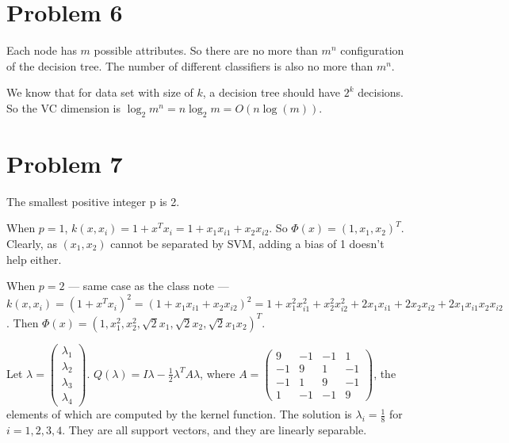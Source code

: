 \documentclass[10pt]{article}
\begin{document}
\section*{Problem 6}

Each node has $m$ possible attributes. So there are no more than
$m^n$ configuration of the decision tree. The number of different
classifiers is also no more than $m^n$.

We know that for data set with size of $k$, a decision tree should
have $2^k$ decisions. So the VC dimension is $\log_2{m^n} = n
\log_2{m} = O(n\log(m))$.

\section*{Problem 7}

The smallest positive integer p is 2.

When $p = 1$, $k(x, x_i) = 1 + x^T x_i = 1 + x_1 x_{i1} + x_2 x_{i2}$.
So $\Phi(x) = (1, x_1, x_2)^T$. Clearly, as $(x_1, x_2)$ cannot be
separated by SVM, adding a bias of 1 doesn't help either.

When $p = 2$ --- same case as the class note --- $k(x, x_i) = (1 + x^T
x_i)^2 = (1 + x_1 x_{i1} + x_2 x_{i2})^2 = 1 + x_1^2 x_{i1}^2 + x_2^2
x_{i2}^2 + 2x_1x_{i1} + 2x_2x_{i2} + 2x_1x_{i1}x_2x_{i2}$. Then
$\Phi(x) = (1, x_1^2, x_2^2, \sqrt{2}x_1, \sqrt{2}x_2,
\sqrt{2}x_1x_2)^T$.

% 
% 
% 

Let $\lambda = \begin{pmatrix}
\lambda_1\\\lambda_2\\\lambda_3\\\lambda_4 \end{pmatrix}$.
$Q(\lambda) = I\lambda - \frac{1}{2} \lambda^T A \lambda $, where $A =
\begin{pmatrix}
9 & -1 & -1 & 1\\
-1 & 9 & 1 & -1\\
-1 & 1 & 9 & -1\\
1 & -1 & -1 & 9
\end{pmatrix}
$, the elements of which are computed by the kernel function. The
solution is $\lambda_i = \frac{1}{8}$ for $i = 1,2,3,4$. They are all
support vectors, and they are linearly separable.
\end{document}
